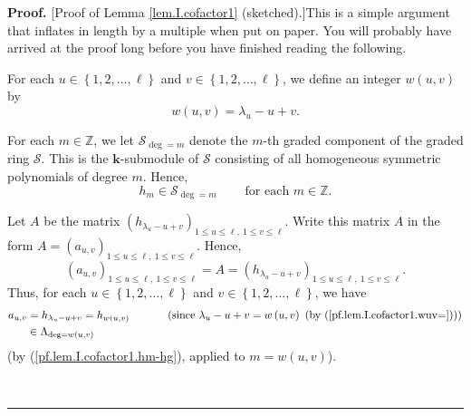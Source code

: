 \documentclass[numbers=enddot,12pt,final,onecolumn,notitlepage]{scrartcl}%
\theoremstyle{definition}
\newenvironment{proof}[1][Proof]{\noindent\textbf{#1.} }{\ \rule{0.5em}{0.5em}}
\newenvironment{noncompile}{}{}
\begin{document}
\begin{proof}
[Proof of Lemma \ref{lem.I.cofactor1} (sketched).]This is a simple argument
that inflates in length by a multiple when put on paper. You will probably
have arrived at the proof long before you have finished reading the following.

For each $u\in\left\{  1,2,\ldots,\ell\right\}  $ and $v\in\left\{
1,2,\ldots,\ell\right\}  $, we define an integer $w\left(  u,v\right)  $ by%
\begin{equation}
w\left(  u,v\right)  =\lambda_{u}-u+v. \label{pf.lem.I.cofactor1.wuv=}%
\end{equation}


\begin{noncompile}
For each $m\in\mathbb{Z}$, we let $\mathcal{S}_{\deg=m}$ denote the $m$-th
graded component of the graded ring $\mathcal{S}$. This is the $\mathbf{k}%
$-submodule of $\mathcal{S}$ consisting of all homogeneous symmetric
polynomials of degree $m$. Hence,%
\begin{equation}
h_{m}\in\mathcal{S}_{\deg=m}\ \ \ \ \ \ \ \ \ \ \text{for each }m\in
\mathbb{Z}. \label{pf.lem.I.cofactor1.hm-hg}%
\end{equation}


Let $A$ be the matrix $\left(  h_{\lambda_{u}-u+v}\right)  _{1\leq u\leq
\ell,\ 1\leq v\leq\ell}$. Write this matrix $A$ in the form $A=\left(
a_{u,v}\right)  _{1\leq u\leq\ell,\ 1\leq v\leq\ell}$. Hence,%
\[
\left(  a_{u,v}\right)  _{1\leq u\leq\ell,\ 1\leq v\leq\ell}=A=\left(
h_{\lambda_{u}-u+v}\right)  _{1\leq u\leq\ell,\ 1\leq v\leq\ell}.
\]
Thus, for each $u\in\left\{  1,2,\ldots,\ell\right\}  $ and $v\in\left\{
1,2,\ldots,\ell\right\}  $, we have%
\begin{align}
a_{u,v}  &  =h_{\lambda_{u}-u+v}=h_{w\left(  u,v\right)  }%
\ \ \ \ \ \ \ \ \ \ \left(  \text{since }\lambda_{u}-u+v=w\left(  u,v\right)
\text{ (by (\ref{pf.lem.I.cofactor1.wuv=}))}\right) \nonumber\\
&  \in\Lambda_{\deg=w\left(  u,v\right)  } \label{pf.lem.I.cofactor1.auv-hg}%
\end{align}
(by (\ref{pf.lem.I.cofactor1.hm-hg}), applied to $m=w\left(  u,v\right)  $).
\end{noncompile}


\end{proof}
\end{document}
